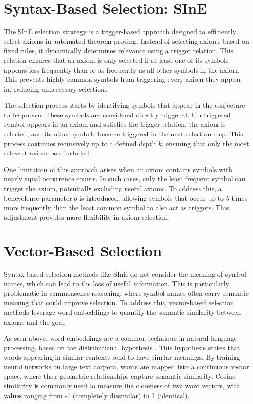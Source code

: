 \documentclass[english,version-2020-11]{uzl-thesis}
\begin{document}
\section{Syntax-Based Selection: SInE}

The SInE selection strategy \cite{Hoder2011} is a trigger-based approach designed to efficiently select axioms in automated theorem proving. Instead of selecting axioms based on fixed rules, it dynamically determines relevance using a trigger relation. This relation ensures that an axiom is only selected if at least one of its symbols appears less frequently than or as frequently as all other symbols in the axiom. This prevents highly common symbols from triggering every axiom they appear in, reducing unnecessary selections.

The selection process starts by identifying symbols that appear in the conjecture to be proven. These symbols are considered directly triggered. If a triggered symbol appears in an axiom and satisfies the trigger relation, the axiom is selected, and its other symbols become triggered in the next selection step. This process continues recursively up to a defined depth \( k \), ensuring that only the most relevant axioms are included.

One limitation of this approach arises when an axiom contains symbols with nearly equal occurrence counts. In such cases, only the least frequent symbol can trigger the axiom, potentially excluding useful axioms. To address this, a benevolence parameter \( b \) is introduced, allowing symbols that occur up to \( b \) times more frequently than the least common symbol to also act as triggers. This adjustment provides more flexibility in axiom selection.

\section{Vector-Based Selection}

Syntax-based selection methods like SInE do not consider the meaning of symbol names, which can lead to the loss of useful information. This is particularly problematic in commonsense reasoning, where symbol names often carry semantic meaning that could improve selection. To address this, vector-based selection methods leverage word embeddings to quantify the semantic similarity between axioms and the goal.

As seen above, word embeddings are a common technique in natural language processing, based on the distributional hypothesis \cite{Miller1991}. This hypothesis states that words appearing in similar contexts tend to have similar meanings. By training neural networks on large text corpora, words are mapped into a continuous vector space, where their geometric relationships capture semantic similarity. Cosine similarity is commonly used to measure the closeness of two word vectors, with values ranging from -1 (completely dissimilar) to 1 (identical).
\end{document}
